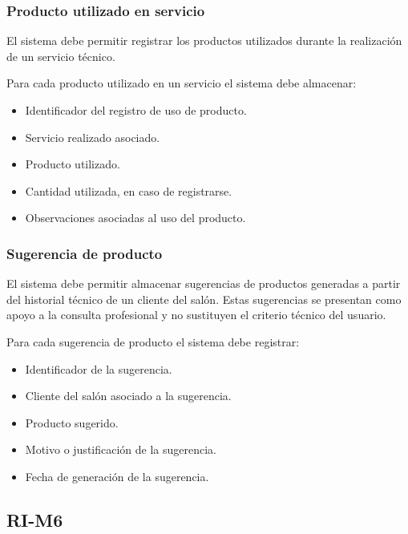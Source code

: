 \subsubsection*{Producto utilizado en servicio}

El sistema debe permitir registrar los productos utilizados durante la realización de un servicio técnico.

Para cada producto utilizado en un servicio el sistema debe almacenar:

\begin{itemize}
    \item Identificador del registro de uso de producto.
    \item Servicio realizado asociado.
    \item Producto utilizado.
    \item Cantidad utilizada, en caso de registrarse.
    \item Observaciones asociadas al uso del producto.
\end{itemize}

\subsubsection*{Sugerencia de producto}

El sistema debe permitir almacenar sugerencias de productos generadas a partir del historial técnico de un cliente del salón. Estas sugerencias se presentan como apoyo a la consulta profesional y no sustituyen el criterio técnico del usuario.

Para cada sugerencia de producto el sistema debe registrar:

\begin{itemize}
    \item Identificador de la sugerencia.
    \item Cliente del salón asociado a la sugerencia.
    \item Producto sugerido.
    \item Motivo o justificación de la sugerencia.
    \item Fecha de generación de la sugerencia.
\end{itemize}

\subsection{RI-M6}

